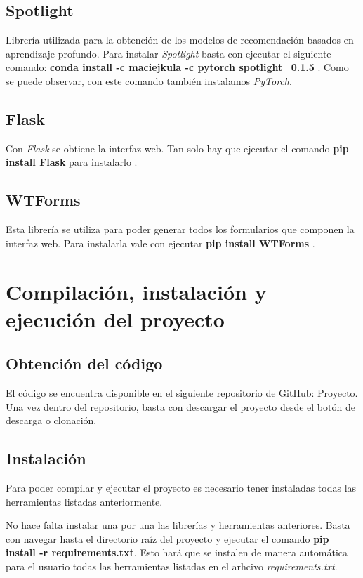 \subsection{Spotlight}
Librería utilizada para la obtención de los modelos de recomendación basados en aprendizaje profundo. Para instalar \textit{Spotlight} basta con ejecutar el siguiente comando: \textbf{conda install -c maciejkula -c pytorch spotlight=0.1.5} \cite{instalacion-spotlight}. Como se puede observar, con este comando también instalamos \textit{PyTorch}.

\subsection{Flask}
Con \textit{Flask} se obtiene la interfaz web. Tan solo hay que ejecutar el comando \textbf{pip install Flask} para instalarlo \cite{instalacion-flask}.

\subsection{WTForms}
Esta librería se utiliza para poder generar todos los formularios que componen la interfaz web. Para instalarla vale con ejecutar \textbf{pip install WTForms} \cite{instalacion-wtforms}.

\section{Compilación, instalación y ejecución del proyecto}
\subsection{Obtención del código}
El código se encuentra disponible en el siguiente repositorio de GitHub: \href{https://github.com/rnc0011/SistemaRecomendacionTFG}{Proyecto}. Una vez dentro del repositorio, basta con descargar el proyecto desde el botón de descarga o clonación.


\subsection{Instalación}
Para poder compilar y ejecutar el proyecto es necesario tener instaladas todas las herramientas listadas anteriormente.

No hace falta instalar una por una las librerías y herramientas anteriores. Basta con navegar hasta el directorio raíz del proyecto y ejecutar el comando \textbf{pip install -r requirements.txt}. Esto hará que se instalen de manera automática para el usuario todas las herramientas listadas en el arhcivo \textit{requirements.txt}.

